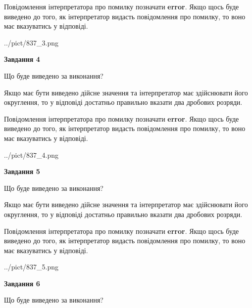 \documentclass[12pt, ukrainian]{article}
\begin{document}
{\begin {Large}
Повідомлення інтерпретатора про помилку позначати \textbf{error}.
Якщо щось буде виведено до того, як інтерпретатор видасть повідомлення про помилку, 
то воно має вказуватись у відповіді. \par

\begin{center}
	{../pict/837_3.png}
\end{center}
\newpage

{\begin {center}\textbf{Завдання 4}\end {center}}\par
Що буде виведено за виконання? \par

Якщо має бути виведено дійсне значення та інтерпретатор має здійснювати його округлення, 
то у відповіді достатньо правильно вказати два дробових розряди.

Повідомлення інтерпретатора про помилку позначати \textbf{error}.
Якщо щось буде виведено до того, як інтерпретатор видасть повідомлення про помилку, 
то воно має вказуватись у відповіді. \par

\begin{center}
	{../pict/837_4.png}
\end{center}
\newpage

{\begin {center}\textbf{Завдання 5}\end {center}}\par
Що буде виведено за виконання? \par

Якщо має бути виведено дійсне значення та інтерпретатор має здійснювати його округлення, 
то у відповіді достатньо правильно вказати два дробових розряди.

Повідомлення інтерпретатора про помилку позначати \textbf{error}.
Якщо щось буде виведено до того, як інтерпретатор видасть повідомлення про помилку, 
то воно має вказуватись у відповіді. \par

\begin{center}
	{../pict/837_5.png}
\end{center}
\newpage

{\begin {center}\textbf{Завдання 6}\end {center}}\par
Що буде виведено за виконання? \par


\end{Large}}
\end{document}
